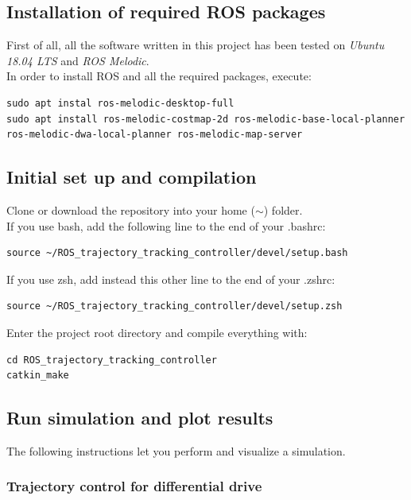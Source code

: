 \documentclass[11pt,a4paper]{article}
\begin{document}
\subsection{Installation of required ROS packages}

First of all, all the software written in this project has been tested on \textit{Ubuntu 18.04 LTS} and \textit{ROS Melodic}.\\

In order to install ROS and all the required packages, execute:

\begin{lstlisting}
sudo apt instal ros-melodic-desktop-full
sudo apt install ros-melodic-costmap-2d ros-melodic-base-local-planner ros-melodic-dwa-local-planner ros-melodic-map-server
\end{lstlisting}


\subsection{Initial set up and compilation}

Clone or download the repository into your home ($\sim$) folder.\\

If you use bash, add the following line to the end of your .bashrc:
\begin{lstlisting}
source ~/ROS_trajectory_tracking_controller/devel/setup.bash
\end{lstlisting}

If you use zsh, add instead this other line to the end of your .zshrc:
\begin{lstlisting}
source ~/ROS_trajectory_tracking_controller/devel/setup.zsh
\end{lstlisting}

Enter the project root directory and compile everything with:
\begin{lstlisting}
cd ROS_trajectory_tracking_controller
catkin_make
\end{lstlisting}

\subsection{Run simulation and plot results}

The following instructions let you perform and visualize a simulation.

\subsubsection{Trajectory control for differential drive}
\end{document}
